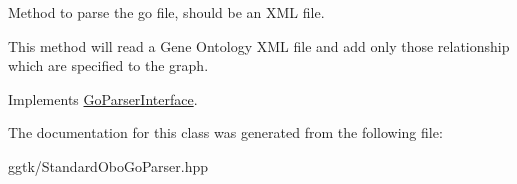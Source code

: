 Method to parse the go file, should be an X\+ML file. 

This method will read a Gene Ontology X\+ML file and add only those relationship which are specified to the graph. 

Implements \hyperlink{classGoParserInterface_aefde440e0d5404b9efa2a16a89e09674}{Go\+Parser\+Interface}.



The documentation for this class was generated from the following file\+:\begin{DoxyCompactItemize}
\item 
ggtk/Standard\+Obo\+Go\+Parser.\+hpp\end{DoxyCompactItemize}
